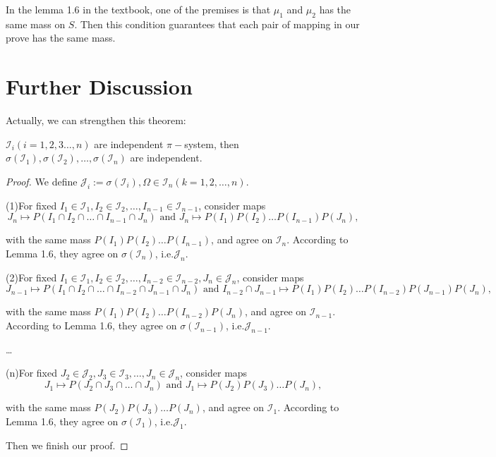 \begin{solution}
  In the lemma 1.6 in the  textbook, one of the premises is that $\mu_1$ and $\mu_2$ has the same mass on $S$. Then this condition guarantees that each pair of mapping in our prove has the same mass.
\end{solution}

\section{Further Discussion}
Actually, we can strengthen this theorem:
	\begin{theorem}
		$\mathcal I_i(i = 1,2,3\dots,n)$ are independent  $\pi-$system, then $\sigma(\mathcal I_1), \sigma(\mathcal I_2),\dots,\sigma(\mathcal I_n)$ are independent.
	\end{theorem}
	\begin{proof}
		We define $\mathcal J_i := \sigma(\mathcal I_i),\Omega\in \mathcal I_n(k = 1,2,\dots,n).$  
		
		(1)For fixed $I_1\in \mathcal I_1, I_2\in \mathcal I_2,\dots, I_{n-1}\in \mathcal I_{n-1}$, consider maps
		$$J_{n}\mapsto P(I_1\cap I_2\cap \dots\cap I_{n-1}\cap J_{n}) \text{ and } J_{n}\mapsto P(I_1)P(I_2)\dots P(I_{n-1})P(J_{n}),$$
		
		with the same mass $P(I_1)P(I_2)\dots P(I_{n-1})$, and agree on $\mathcal I_{n}$. According to Lemma 1.6, they agree on $\sigma(\mathcal I_{n})$, i.e.$\mathcal J_{n}$.
		
		(2)For fixed $I_1\in \mathcal I_1, I_2\in \mathcal I_2,\dots, I_{n-2}\in \mathcal I_{n-2},J_{n}\in\mathcal J_{n}$, consider maps
		$$J_{n-1}\mapsto P(I_1\cap I_2\cap \dots\cap I_{n-2}\cap J_{n-1}\cap J_{n}) \text{ and } I_{n-2}\cap J_{n-1}\mapsto P(I_1)P(I_2)\dots P(I_{n-2})P(J_{n-1})P(J_{n}),$$
		
		with the same mass $P(I_1)P(I_2)\dots P(I_{n-2})P(J_{n})$, and agree on $\mathcal I_{n-1}$. According to Lemma 1.6, they agree on $\sigma(\mathcal I_{n-1})$, i.e.$\mathcal J_{n-1}$.
		
		\dots
		
		(n)For fixed $J_2\in \mathcal J_2, J_3\in \mathcal I_3,\dots, J_{n}\in\mathcal J_{n}$, consider maps
		$$J_{1}\mapsto P(J_2\cap J_3\cap \dots\cap J_{n}) \text{ and } J_{1}\mapsto P(J_2)P(J_3)\dots P(J_{n}),$$
		
		with the same mass $P(J_2)P(J_3)\dots P(J_{n})$, and agree on $\mathcal I_{1}$. According to Lemma 1.6, they agree on $\sigma(\mathcal I_{1})$, i.e.$\mathcal J_{1}$.
		
		Then we finish our proof.
		
	\end{proof}

